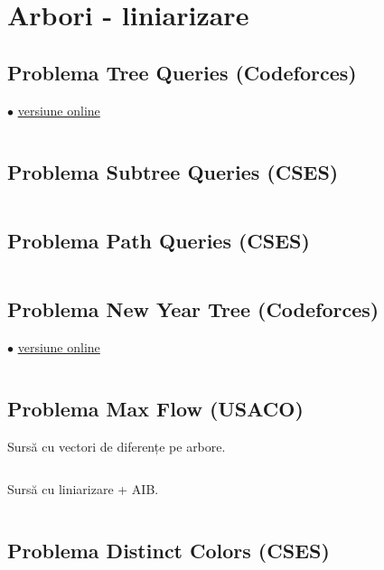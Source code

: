 \documentclass[../main.tex]{subfiles}
\begin{document}
\chapter{Arbori - liniarizare}

\section{Problema Tree Queries (Codeforces)}
\label{code:tree-queries}
$\bullet$
\href{https://codeforces.com/contest/1328/submission/232358697}{versiune online}

\inputminted{cpp}{../src/trees/tree-queries.cpp}

\section{Problema Subtree Queries (CSES)}
\label{code:subtree-queries}

\inputminted{cpp}{../src/trees/subtree-queries.cpp}

\section{Problema Path Queries (CSES)}
\label{code:path-queries}

\inputminted{cpp}{../src/trees/path-queries.cpp}

\section{Problema New Year Tree (Codeforces)}
\label{code:new-year-tree}
$\bullet$
\href{https://codeforces.com/contest/620/submission/292999954}{versiune online}

\inputminted{cpp}{../src/trees/new-year-tree.cpp}

\section{Problema Max Flow (USACO)}
\label{code:max-flow}

Sursă cu vectori de diferențe pe arbore.

\inputminted{cpp}{../src/trees/max-flow-1.cpp}

Sursă cu liniarizare + AIB.

\inputminted{cpp}{../src/trees/max-flow-2.cpp}

\section{Problema Distinct Colors (CSES)}
\label{code:distinct-colors}
\end{document}

